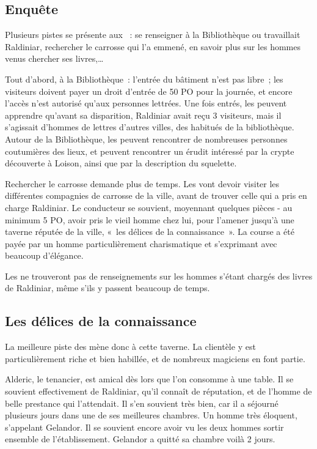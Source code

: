 \documentclass[a4paper,10pt,openany]{book}
\begin{document}
\begin{multicols}{2}
\subsection{Enquête}
Plusieurs pistes se présente aux \PJs : se renseigner à la Bibliothèque ou travaillait Raldiniar, rechercher le carrosse qui l’a emmené, en savoir
plus sur les hommes venus chercher ses livres,\ldots\par Tout d’abord, à la Bibliothèque : l’entrée du bâtiment n’est pas libre ; les visiteurs
doivent payer un droit d’entrée de 50 PO pour la journée, et encore l’accès n’est autorisé qu’aux personnes lettrées. Une fois entrés, les \PJs
peuvent apprendre qu’avant sa disparition, Raldiniar avait reçu 3 visiteurs, mais il s’agissait d’hommes de lettres d’autres villes, des habitués de
la bibliothèque. Autour de la Bibliothèque, les \PJs peuvent rencontrer de nombreuses personnes coutumières des lieux, et peuvent rencontrer un érudit
intéressé par la crypte découverte à Loison, ainsi que par la description du squelette.\par Rechercher le carrosse demande plus de temps. Les \PJs
vont devoir visiter les différentes compagnies de carrosse de la ville, avant de trouver celle qui a pris en charge Raldiniar. Le conducteur se
souvient, moyennant quelques pièces - au minimum 5 PO, avoir pris le vieil homme chez lui, pour l’amener jusqu’à une taverne réputée de la ville,
« les délices de la connaissance ». La course a été payée par un homme particulièrement charismatique et s’exprimant avec beaucoup d’élégance.\par
Les \PJs ne trouveront pas de renseignements sur les hommes s’étant chargés des livres de Raldiniar, même s’ils y passent beaucoup de temps.

\subsection{Les délices de la connaissance}
La meilleure piste des \PJs mène donc à cette taverne. La clientèle y est particulièrement riche et bien habillée, et de nombreux magiciens en font
partie.\par Alderic, le tenancier, est amical dès lors que l’on consomme à une table. Il se souvient effectivement de Raldiniar, qu’il connaît de
réputation, et de l’homme de belle prestance qui l’attendait. Il s’en souvient très bien, car il a séjourné plusieurs jours dans une de ses meilleures
chambres. Un homme très éloquent, s’appelant Gelandor. Il se souvient encore avoir vu les deux hommes sortir ensemble de l’établissement. Gelandor a
quitté sa chambre voilà 2 jours.


\end{multicols}
\end{document}
